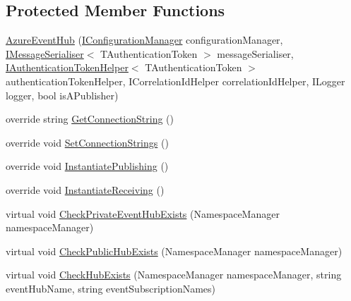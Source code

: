 \subsection*{Protected Member Functions}
\begin{DoxyCompactItemize}
\item 
\hyperlink{classCqrs_1_1Azure_1_1ServiceBus_1_1AzureEventHub_adef2c26639ae4a7725c397da7fd90000_adef2c26639ae4a7725c397da7fd90000}{Azure\+Event\+Hub} (\hyperlink{interfaceCqrs_1_1Configuration_1_1IConfigurationManager}{I\+Configuration\+Manager} configuration\+Manager, \hyperlink{interfaceCqrs_1_1Azure_1_1ServiceBus_1_1IMessageSerialiser}{I\+Message\+Serialiser}$<$ T\+Authentication\+Token $>$ message\+Serialiser, \hyperlink{interfaceCqrs_1_1Authentication_1_1IAuthenticationTokenHelper}{I\+Authentication\+Token\+Helper}$<$ T\+Authentication\+Token $>$ authentication\+Token\+Helper, I\+Correlation\+Id\+Helper correlation\+Id\+Helper, I\+Logger logger, bool is\+A\+Publisher)
\item 
override string \hyperlink{classCqrs_1_1Azure_1_1ServiceBus_1_1AzureEventHub_a9855633b53ed1f67863ef9dffad0812c_a9855633b53ed1f67863ef9dffad0812c}{Get\+Connection\+String} ()
\item 
override void \hyperlink{classCqrs_1_1Azure_1_1ServiceBus_1_1AzureEventHub_af823e573f3acc3fa9949969499309db1_af823e573f3acc3fa9949969499309db1}{Set\+Connection\+Strings} ()
\item 
override void \hyperlink{classCqrs_1_1Azure_1_1ServiceBus_1_1AzureEventHub_a3747fb9fcb3de2a72c8a6d7bbd92db95_a3747fb9fcb3de2a72c8a6d7bbd92db95}{Instantiate\+Publishing} ()
\item 
override void \hyperlink{classCqrs_1_1Azure_1_1ServiceBus_1_1AzureEventHub_aa725781eddb65bdfe456a4fecb36fb6b_aa725781eddb65bdfe456a4fecb36fb6b}{Instantiate\+Receiving} ()
\item 
virtual void \hyperlink{classCqrs_1_1Azure_1_1ServiceBus_1_1AzureEventHub_af43ec28c427d2d45370ef2401864db4b_af43ec28c427d2d45370ef2401864db4b}{Check\+Private\+Event\+Hub\+Exists} (Namespace\+Manager namespace\+Manager)
\item 
virtual void \hyperlink{classCqrs_1_1Azure_1_1ServiceBus_1_1AzureEventHub_ae60a7cddcb566ff8f5cf2ac2db17733e_ae60a7cddcb566ff8f5cf2ac2db17733e}{Check\+Public\+Hub\+Exists} (Namespace\+Manager namespace\+Manager)
\item 
virtual void \hyperlink{classCqrs_1_1Azure_1_1ServiceBus_1_1AzureEventHub_af9cafb2d7025844b0bf37ee6a6a0f635_af9cafb2d7025844b0bf37ee6a6a0f635}{Check\+Hub\+Exists} (Namespace\+Manager namespace\+Manager, string event\+Hub\+Name, string event\+Subscription\+Names)

\end{DoxyCompactItemize}
